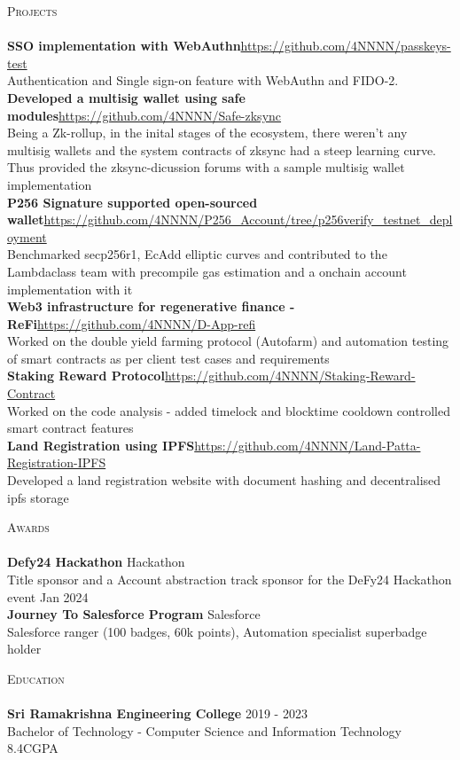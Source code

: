\documentclass[a4paper]{article}
\newcommand{\lineunder} {
    \vspace*{-8pt} \\
    \hspace*{-18pt} \hrulefill \\
}
\newcommand{\header} [1] {
    {\hspace*{-18pt}\vspace*{6pt} \textsc{#1}}
    \vspace*{-6pt} \lineunder
}
\begin{document}
\header{Projects}
{\textbf{SSO implementation with WebAuthn}}\hfill \url{https://github.com/4NNNN/passkeys-test}\\
Authentication and Single sign-on feature with WebAuthn and FIDO-2.\\
\vspace*{2mm}
{\textbf{Developed a multisig wallet using safe modules}}\hfill \url{https://github.com/4NNNN/Safe-zksync}\\
Being a Zk-rollup, in the inital stages of the ecosystem, there weren't any multisig wallets and the system contracts of zksync had a steep learning curve. Thus provided the zksync-dicussion forums with a sample multisig wallet implementation\\
\vspace*{2mm}
{\textbf{P256 Signature supported open-sourced wallet}}\hfill \url{https://github.com/4NNNN/P256_Account/tree/p256verify_testnet_deployment}\\
Benchmarked secp256r1, EcAdd elliptic curves and contributed to the Lambdaclass team with precompile gas estimation and a onchain account implementation with it\\
\vspace*{2mm}
{\textbf{Web3 infrastructure for regenerative finance - ReFi}}\hfill \url{https://github.com/4NNNN/D-App-refi}\\
Worked on the double yield farming protocol (Autofarm) and automation testing of smart contracts as per client test cases and requirements\\
\vspace*{2mm}
{\textbf{Staking Reward Protocol}}\hfill \url{https://github.com/4NNNN/Staking-Reward-Contract}\\
Worked on the code analysis - added timelock and blocktime cooldown controlled smart contract features\\
\vspace*{2mm}
{\textbf{Land Registration using IPFS}}\hfill \url{https://github.com/4NNNN/Land-Patta-Registration-IPFS}\\
Developed a land registration website with document hashing and decentralised ipfs storage\\
\vspace*{2mm}

\header{Awards}
\textbf{Defy24 Hackathon} \hfill Hackathon\\
Title sponsor and a Account abstraction track sponsor for the DeFy24 Hackathon event \hfill Jan 2024\\
\vspace*{2mm}
\textbf{Journey To Salesforce Program} \hfill Salesforce\\
Salesforce ranger (100 badges, 60k points), Automation specialist superbadge holder
\vspace*{2mm}

\header{Education}
\textbf{Sri Ramakrishna Engineering College} \hfill 2019 - 2023\\
Bachelor of Technology - Computer Science and Information Technology \hfill 8.4CGPA\\
\vspace*{2mm}

\
\end{document}
